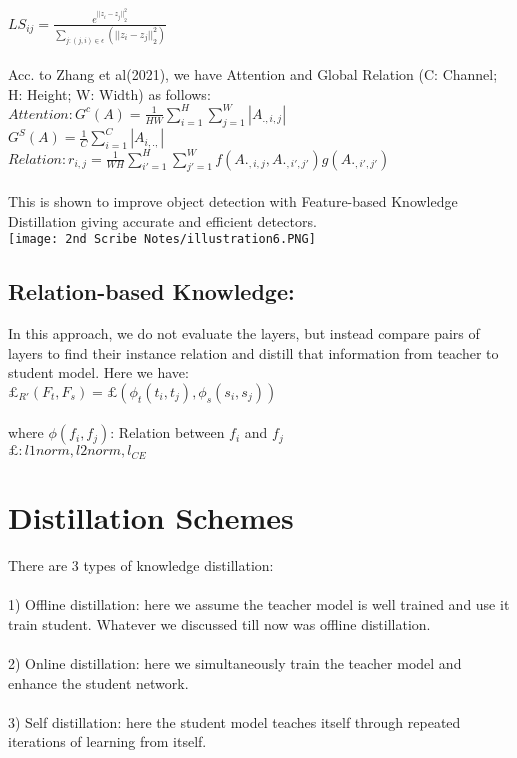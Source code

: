 \documentclass[12pt]{article}
\begin{document}
    $LS_{ij} = \frac{e^{{||z_i-z_j||}^2_2}}{\sum_{j:(j,i)\in \epsilon}({||z_i-z_j||}^2_2)}$ \\
    \\
    Acc. to Zhang et al(2021), we have Attention and Global Relation (C: Channel; H:
    Height; W: Width) as follows:\\

    $Attention: G^c(A) = \frac{1}{HW}\sum^H_{i=1}\sum^W_{j=1}|A_{.,i,j}|$\\
    
       $G^S(A)=\frac{1}{C} \sum^C_{i=1}|A_{i,.,}|$\\
       
       $Relation: r_{i,j} = \frac{1}{WH}\sum^H_{i'=1}\sum^W_{j'=1}f(A._{,i,j},A._{,i',j'})g(A._{,i',j'})$\\
    \\  
    This is shown to improve object detection with Feature-based Knowledge
    Distillation giving accurate and efficient detectors.
    \\
    \texttt{[image: 2nd Scribe Notes/illustration6.PNG]}
    \\
    \subsection{Relation-based Knowledge:} 
    
    In this approach, we do not evaluate the layers, but instead compare pairs of layers to find their instance relation and distill that information from teacher to student model. Here we have:\\
    
    $\pounds_{R'}(F_t,F_s) = \pounds(\phi_t(t_i,t_j),\phi_s(s_i,s_j))$\\
    \\
    where $\phi(f_i,f_j)$: Relation between $f_i$ and $f_j$ \\
    $ \pounds : l1{}norm,{} l2{} norm, {}l_{CE}$
    
    \section{Distillation Schemes}
    There are 3 types of knowledge distillation:\\
    \\
    1) Offline distillation: here we assume the teacher model is well trained and use it train student. Whatever we discussed till now was offline distillation.\\
    \\
    2) Online distillation: here we simultaneously train the teacher model and enhance the student network.\\
    \\
    3) Self distillation: here the student model teaches itself through repeated iterations of learning from itself.
    
\end{document}
